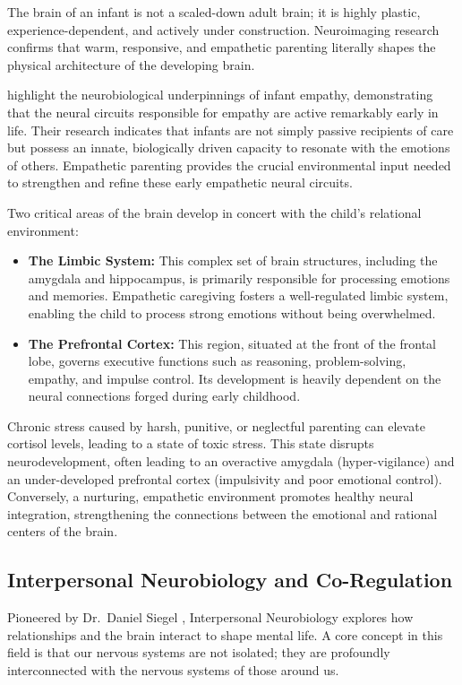 The brain of an infant is not a scaled-down adult brain; it is highly plastic,
experience-dependent, and actively under construction. 
Neuroimaging research confirms that warm, responsive, and empathetic parenting literally shapes the physical architecture of the developing brain.

\citet{decety2021} highlight the neurobiological underpinnings of infant empathy,
demonstrating that the neural circuits responsible for empathy are active remarkably early in life. 
Their research indicates that infants are not simply passive recipients of care but possess an innate, biologically driven capacity to resonate with the emotions of others.
Empathetic parenting provides the crucial environmental input needed to strengthen and refine these early empathetic neural circuits.

Two critical areas of the brain develop in concert with the child's relational
environment:
\begin{itemize}
    \item \textbf{The Limbic System:} This complex set of brain structures, including the amygdala and hippocampus, is primarily responsible for processing emotions and memories.
    Empathetic caregiving fosters a well-regulated limbic system, enabling the child to process strong emotions without being overwhelmed.
    \item \textbf{The Prefrontal Cortex:} This region, situated at the front of the frontal lobe, governs executive functions such as reasoning, problem-solving, empathy, and impulse control.
    Its development is heavily dependent on the neural connections forged during early childhood.
\end{itemize}

Chronic stress caused by harsh, punitive, or neglectful parenting can elevate cortisol levels, leading to a state of toxic stress. 
This state disrupts neurodevelopment, often leading to an overactive amygdala (hyper-vigilance) and an under-developed prefrontal cortex (impulsivity and poor emotional control). 
Conversely, a nurturing, empathetic environment promotes healthy neural integration, strengthening the connections between the emotional and rational centers of the brain.

\subsection{Interpersonal Neurobiology and Co-Regulation}

Pioneered by Dr.\ Daniel Siegel \citep{siegel2011}, Interpersonal Neurobiology explores how relationships and the brain interact to shape mental life. 
A core concept in this field is that our nervous systems are not isolated; they are profoundly interconnected with the nervous systems of those around us.

